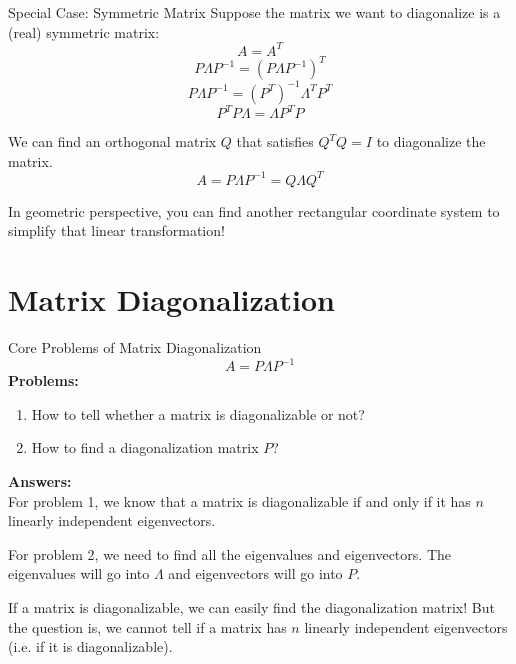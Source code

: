 \documentclass{beamer}
\begin{document}
        \begin{frame}{Special Case: Symmetric Matrix}
        Suppose the matrix we want to diagonalize is a (real) symmetric matrix:
        \begin{equation*}
            A=A^T
        \end{equation*}
        \begin{equation*}
            P\varLambda P^{-1}=\left( P\varLambda P^{-1} \right) ^T
        \end{equation*}
        \begin{equation*}
            P\varLambda P^{-1}=\left( P^T \right) ^{-1}\varLambda ^TP^T
        \end{equation*}
        \begin{equation*}
            P^TP\varLambda =\varLambda P^TP
        \end{equation*}
        
        We can find an orthogonal matrix $Q$ that satisfies $Q^TQ=I$ to diagonalize the matrix.
        \begin{equation*}
            A=P\varLambda P^{-1}=Q\varLambda Q^{T}
        \end{equation*}
        
        In geometric perspective, you can find another rectangular coordinate system to simplify that linear transformation!
        \end{frame}

\section{Matrix Diagonalization}
\begin{frame}{Core Problems of Matrix Diagonalization}
    \begin{equation*}
        A=P\varLambda P^{-1}
    \end{equation*}
\textbf{Problems:}
\begin{enumerate}
    \item How to tell whether a matrix is diagonalizable or not?
    \item How to find a diagonalization matrix $P$?
\end{enumerate}

\textbf{Answers:}\\
\vspace{3pt}
For problem 1, we know that a matrix is diagonalizable if and only if it has $n$ linearly independent eigenvectors.

\vspace{3pt}
For problem 2, we need to find all the eigenvalues and eigenvectors. The eigenvalues will go into $\varLambda$ and eigenvectors will go into $P$.

\vspace{5pt}
If a matrix is diagonalizable, we can easily find the diagonalization matrix! But the question is, we cannot tell if a matrix has $n$ linearly independent eigenvectors (i.e. if it is diagonalizable).
\end{frame}
\end{document}
